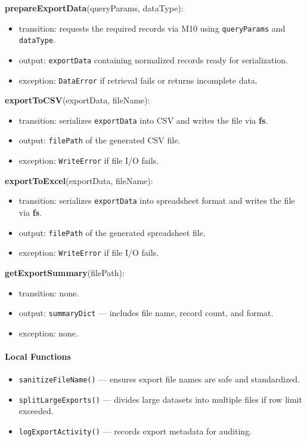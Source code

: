 \documentclass[12pt, titlepage]{article}
\begin{document}
\noindent \textbf{prepareExportData}(queryParams, dataType):
\begin{itemize}
  \item transition: requests the required records via M10 using \texttt{queryParams} and \texttt{dataType}.
  \item output: \texttt{exportData} containing normalized records ready for serialization.
  \item exception: \texttt{DataError} if retrieval fails or returns incomplete data.
\end{itemize}

\noindent \textbf{exportToCSV}(exportData, fileName):
\begin{itemize}
  \item transition: serializes \texttt{exportData} into CSV and writes the file via \textbf{fs}.
  \item output: \texttt{filePath} of the generated CSV file.
  \item exception: \texttt{WriteError} if file I/O fails.
\end{itemize}

\noindent \textbf{exportToExcel}(exportData, fileName):
\begin{itemize}
  \item transition: serializes \texttt{exportData} into spreadsheet format and writes the file via \textbf{fs}.
  \item output: \texttt{filePath} of the generated spreadsheet file.
  \item exception: \texttt{WriteError} if file I/O fails.
\end{itemize}


\noindent \textbf{getExportSummary}(filePath):
\begin{itemize}
  \item transition: none.
  \item output: \texttt{summaryDict} — includes file name, record count, and format.
  \item exception: none.
\end{itemize}

\paragraph{Local Functions}
\begin{itemize}
  \item \texttt{sanitizeFileName()} — ensures export file names are safe and standardized.
  \item \texttt{splitLargeExports()} — divides large datasets into multiple files if row limit exceeded.
  \item \texttt{logExportActivity()} — records export metadata for auditing.
\end{itemize}
\end{document}
